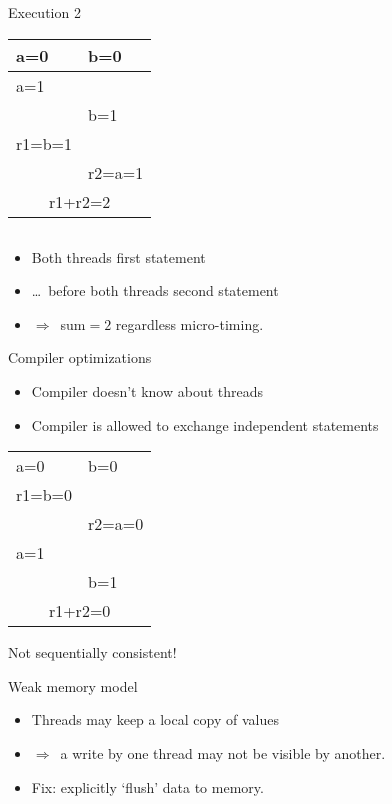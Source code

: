 \begin{numberedframe}{Execution 2}
  \begin{tabular}{|l|l|}
    \hline
    a=0&b=0\\ \hline
    a=1&\\
    &b=1\\
    r1=b=1&\\
    &r2=a=1\\ \hline
    \multicolumn{2}{|c|}{r1+r2=2}\\
    \hline
  \end{tabular}
\begin{lstlisting}
\end{lstlisting}
  \begin{itemize}
  \item Both threads first statement
  \item \ldots~before both threads second statement
  \item $\Rightarrow$~sum$=2$ regardless micro-timing.
  \end{itemize}
\end{numberedframe}

\begin{numberedframe}{Compiler optimizations}
  \begin{itemize}
  \item Compiler doesn't know about threads
  \item Compiler is allowed to exchange independent statements
  \end{itemize}
  \begin{tabular}{|l|l|}
    \hline
    a=0&b=0\\
    r1=b=0&\\
    &r2=a=0\\
    a=1&\\
    &b=1\\ \hline
    \multicolumn{2}{|c|}{r1+r2=0}\\
    \hline
  \end{tabular}
  Not sequentially consistent!
\end{numberedframe}

\begin{numberedframe}{Weak memory model}
  \begin{itemize}
  \item Threads may keep a local copy of values
  \item $\Rightarrow$~a write by one thread may not be visible
    by another.
  \item Fix: explicitly `flush' data to memory.
  \end{itemize}
\end{numberedframe}

